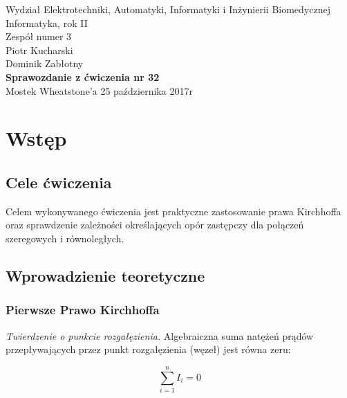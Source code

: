 \documentclass[a4paper,12pts]{article}
\begin{document}
	\thispagestyle{empty}
	\begin{flushleft}
		Wydział Elektrotechniki, Automatyki, Informatyki i Inżynierii Biomedycznej \\
		Informatyka, rok II \\
		Zespół numer 3 \\
		Piotr Kucharski \\
		Dominik Zabłotny \\
		\vspace*{\fill}
		{\large \textbf{Sprawozdanie z ćwiczenia nr 32} } \\
		Mostek Wheatstone'a		
		\vfill	
		25 października 2017r
	\end{flushleft}
	
	\newpage
	
	
	\section{Wstęp}
	
	\subsection{Cele ćwiczenia}
	
	Celem wykonywanego ćwiczenia jest praktyczne zastosowanie prawa Kirchhoffa oraz sprawdzenie zależności określających opór zastępczy dla połączeń szeregowych i równoległych.
	
	
	\subsection{Wprowadzienie teoretyczne}
	
	\subsubsection{Pierwsze Prawo Kirchhoffa}
	
	\textit{Twierdzenie o punkcie rozgałęzienia.} Algebraiczna suma natężeń prądów przepływających przez punkt rozgałęzienia (węzeł) jest równa zeru:
	
	\begin{equation}
		\sum_{i=1}^{n} I_{i} = 0
	\end{equation}
	
\end{document}
